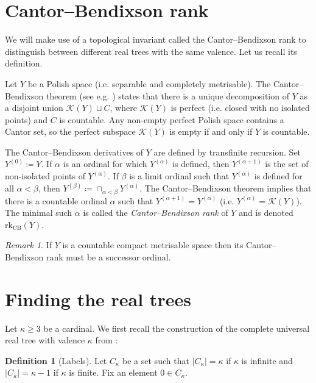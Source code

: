 \documentclass[11pt]{article}
\newcommand{\rkCB}{\mathrm{rk}_\mathrm{CB}}
\theoremstyle{definition}
\newtheorem{definition}[theorem]{Definition}
\theoremstyle{remark}
\newtheorem{remark}[theorem]{Remark}
\begin{document}
\section{Cantor--Bendixson rank}

We will make use of a topological invariant called the Cantor--Bendixson rank to distinguish between different real trees with the same valence. Let us recall its definition.

Let $Y$ be a Polish space (i.e. separable and completely metrisable). The Cantor--Bendixson theorem (see e.g. \cite{KechrisClassical95}) states that there is a unique decomposition of $Y$ as a disjoint union $\mathcal{K}(Y) \sqcup C$, where $\mathcal{K}(Y)$ is perfect (i.e. closed with no isolated points) and $C$ is countable. Any non-empty perfect Polish space contains a Cantor set, so the perfect subspace $\mathcal{K}(Y)$ is empty if and only if $Y$ is countable. 

The Cantor--Bendixson derivatives of $Y$ are defined by transfinite recursion. Set $Y^{(0)} \coloneqq Y$. If $\alpha$ is an ordinal for which $Y^{(\alpha)}$ is defined, then $Y^{(\alpha+1)}$ is the set of non-isolated points of $Y^{(\alpha)}$. If $\beta$ is a limit ordinal such that $Y^{(\alpha)}$ is defined for all $\alpha < \beta$, then $Y^{(\beta)} \coloneqq \cap_{\alpha < \beta} Y^{(\alpha)}$. The Cantor--Bendixson theorem implies that there is a countable ordinal $\alpha$ such that $Y^{(\alpha + 1)} = Y^{(\alpha)}$ (i.e. $Y^{(\alpha)} = \mathcal{K}(Y)$). The minimal such $\alpha$ is called the  \textit{Cantor--Bendixson rank} of $Y$ and is denoted $\rkCB(Y)$.

\begin{remark} \label{rem: CB-rank succesor}
    If $Y$ is a countable compact metrisable space then its Cantor--Bendixson rank must be a successor ordinal. 
\end{remark}

\section{Finding the real trees}

Let $\kappa \geq 3$ be a cardinal. We first recall the construction of the complete universal real tree with valence $\kappa$ from \cite{DyubinaExplicit01}:

\begin{definition}[Labels]
    Let $C_\kappa$ be a set such that $ |C_\kappa| = \kappa$ if $\kappa$ is infinite and $|C_\kappa| = \kappa - 1$ if $\kappa$ is finite. Fix an element $0 \in C_\kappa$. 
\end{definition}
\end{document}
